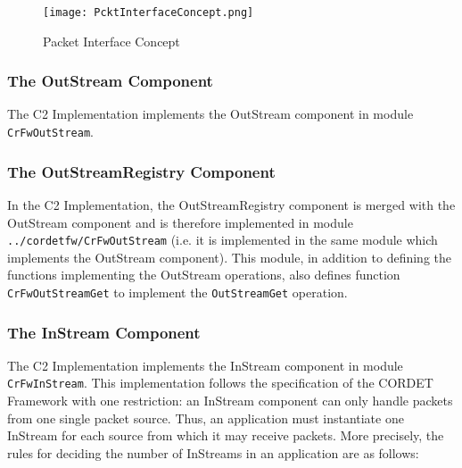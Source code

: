 \documentclass{pnp_article}
\begin{document}
\begin{figure}[ht]
 \centering
 \texttt{[image: PcktInterfaceConcept.png]}
 \caption{Packet Interface Concept}
 \label{fig:PcktInterfaceConcept}
\end{figure}


\subsubsection{The OutStream Component}\label{sec:OutStream}


The C2 Implementation implements the OutStream component in module \texttt{CrFwOutStream}. 


\subsubsection{The OutStreamRegistry Component}\label{sec:OutStreamRegistry}


In the C2 Implementation, the OutStreamRegistry component is merged with the OutStream component and is therefore implemented in module \texttt{../cordetfw/CrFwOutStream} (i.e. it is implemented in the same module which implements the OutStream component). This module, in addition to defining the functions implementing the OutStream operations, also defines function \texttt{CrFwOutStreamGet} to implement the \texttt{OutStreamGet} operation. 


\subsubsection{The InStream Component}\label{sec:InStream}


The C2 Implementation implements the InStream component in module \texttt{CrFwInStream}. This implementation follows the specification of the CORDET Framework with one restriction: an InStream component can only handle packets from one single packet source. Thus, an application must instantiate one InStream for each source from which it may receive packets. More precisely, the rules for deciding the number of InStreams in an application are as follows:
\end{document}
